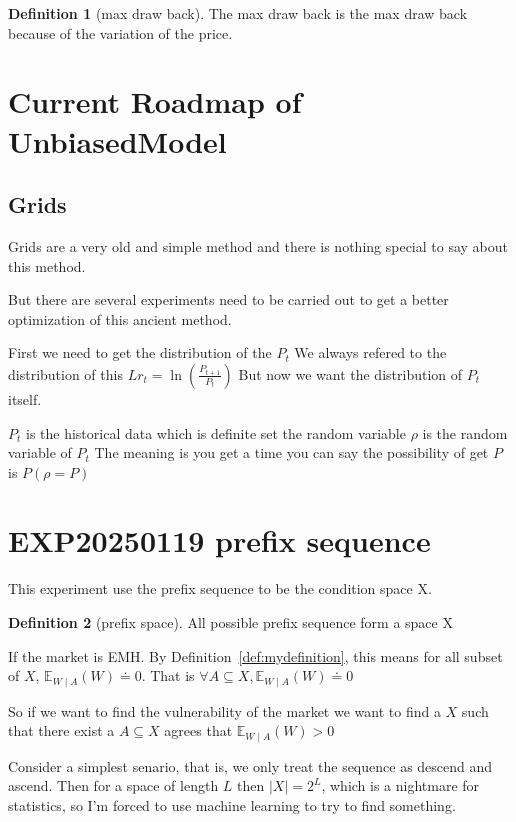 \documentclass{article}
\theoremstyle{definition} %
\newtheorem{definition}{Definition}[section]
\begin{document}
\begin{definition}[max draw back]
    \label{def:maxDrawBack}
    The max draw back is the max draw back
    because of the variation of the price.
\end{definition}

\section{Current Roadmap of UnbiasedModel}
\subsection{Grids}
Grids are a very old and simple method and
there is nothing special to say about this
method.

But there are several experiments need to
be carried out to get a better optimization
of this ancient method.

First we need to get the distribution of the
$P_t$
We always refered to the distribution of this
$Lr_t=\ln(\frac{P_{t+1}}{P_{t}})$
But now we want the distribution of $P_t$
itself.

$P_t$ is the historical data which is definite
set the random variable $\rho$ is the random
variable of $P_t$
The meaning is you get a time you can say the
possibility of get $P$ is $P(\rho=P)$


\section{EXP20250119 prefix sequence}
This experiment use the prefix sequence
to be the condition space X.

\begin{definition}[prefix space]
    All possible prefix sequence form a space X
\end{definition}

If the market is EMH.
By Definition~\ref{def:mydefinition}, this means
for all subset of $X$,
$\mathbb{E}_{W\mid A}(W)\doteq 0$. That is
$
    \forall A\subseteq X,
    \mathbb{E}_{W\mid A}(W)\doteq 0
$

So if we want to find the vulnerability of
the market we want to find a $X$ such that
there exist a $A\subseteq X$ agrees that
$\mathbb{E}_{W\mid A}(W)>0$

Consider a simplest senario, that is, we only
treat the sequence as descend and ascend. Then
for a space of length $L$ then
$\left|X\right|=2^L$, which is a nightmare for
statistics, so I'm forced to use machine learning
to try to find something.
\end{document}
